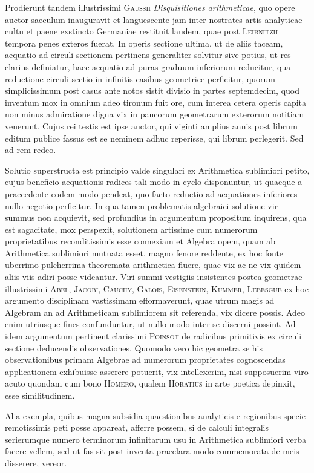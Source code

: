 \documentclass[11pt]{article}
\newcommand{\scn}[1]{\textsc{#1}}
\begin{document}
Prodierunt tandem illustrissimi \scn{Gaussii} \emph{Disquisitiones arithmeticae}, quo opere auctor saeculum inauguravit et languescente jam inter nostrates artis analyticae cultu et paene exstincto Germaniae restituit laudem, quae post \scn{Leibnitzii} tempora penes exteros fuerat. In operis sectione ultima, ut de aliis taceam, aequatio ad circuli sectionem pertinens generaliter solvitur sive potius, ut res clarius definiatur, haec aequatio ad puras graduum inferiorum reducitur, qua reductione circuli sectio in infinitis casibus geometrice perficitur, quorum simplicissimum post casus ante notos sistit divisio in partes septemdecim, quod inventum mox in omnium adeo tironum fuit ore, cum interea cetera operis capita non minus admiratione digna vix in paucorum geometrarum exterorum notitiam venerunt. Cujus rei testis est ipse auctor, qui viginti amplius annis post librum editum publice fassus est se neminem adhuc reperisse, qui librum perlegerit. Sed ad rem redeo.

Solutio superstructa est principio valde singulari ex Arithmetica sublimiori petito, cujus beneficio aequationis radices tali modo in cyclo disponuntur, ut quaeque a praecedente eodem modo pendeat, quo facto reductio ad aequationes inferiores nullo negotio perficitur. In qua tamen problematis algebraici solutione vir summus non acquievit, sed profundius in argumentum propositum inquirens, qua est sagacitate, mox perspexit, solutionem artissime cum numerorum proprietatibus reconditissimis esse connexiam et Algebra opem, quam ab Arithmetica sublimiori mutuata esset, magno fenore reddente, ex hoc fonte uberrimo pulcherrima theoremata arithmetica fluere, quae vix ac ne vix quidem aliis viis adiri posse videantur. Viri summi vestigiis insistentes postea geometrae illustrissimi \scn{Abel}, \scn{Jacobi}, \scn{Cauchy}, \scn{Galois}, \scn{Eisenstein}, \scn{Kummer}, \scn{Lebesgue} ex hoc argumento disciplinam vastissimam efformaverunt, quae utrum magis ad Algebram an ad Arithmeticam sublimiorem sit referenda, vix dicere possis. Adeo enim utriusque fines confunduntur, ut nullo modo inter se discerni possint. Ad idem argumentum pertinent clarissimi \scn{Poinsot} de radicibus primitivis ex circuli sectione deducendis observationes. Quomodo vero hic geometra se his observationibus primam Algebrae ad numerorum proprietates cognoscendas applicationem exhibuisse asserere potuerit, vix intellexerim, nisi supposuerim viro acuto quondam cum bono \scn{Homero}, qualem \scn{Horatius} in arte poetica depinxit, esse similitudinem.

Alia exempla, quibus magna subsidia quaestionibus analyticis e regionibus specie remotissimis peti posse appareat, afferre possem, si de calculi integralis serierumque numero terminorum infinitarum usu in Arithmetica sublimiori verba facere vellem, sed ut fas sit post inventa praeclara modo commemorata de meis disserere, vereor.
\end{document}
